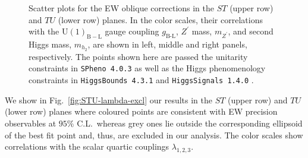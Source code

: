 \documentclass[10pt]{report}
\newcommand{\ro}[1]{\textrm{#1}}
\newcommand{\U}[1]{\mathrm{U}(1)_{\mathrm{#1}}}
\begin{document}
\begin{figure}[!htb]
\caption{Scatter plots for the EW oblique corrections in the $ST$ (upper row) and $TU$ (lower row) planes. In the color scales, their correlations with the $\U{B-L}$ gauge coupling $g_{\ro{B-L}}$, $Z^\prime$ mass, $m_{Z^\prime}$, and second Higgs mass, $m_{h_2}$, are shown in left, 
middle and right panels, respectively. The points shown here are passed the unitarity constraints in \texttt{SPheno 4.0.3} \cite{Porod:2003um,Porod:2011nf} as well as the Higgs phenomenology constraints in \texttt{HiggsBounds 4.3.1} \cite{Bechtle:2013wla} and \texttt{HiggsSignals 1.4.0} \cite{Bechtle:2013xfa}.}
\label{fig:STU-gBL_Zp_HP}
\end{figure}	

 We show in Fig.~\ref{fig:STU-lambda-excl} our results in the $ST$ (upper row) and $TU$ (lower row) planes where coloured points are consistent with EW precision observables at $95\%$ C.L.~whereas grey ones lie outside the corresponding ellipsoid of the best fit point and, thus, are excluded in our analysis. The color scales show correlations with the scalar quartic couplings $\lambda_{1,2,3}$.
\end{document}

